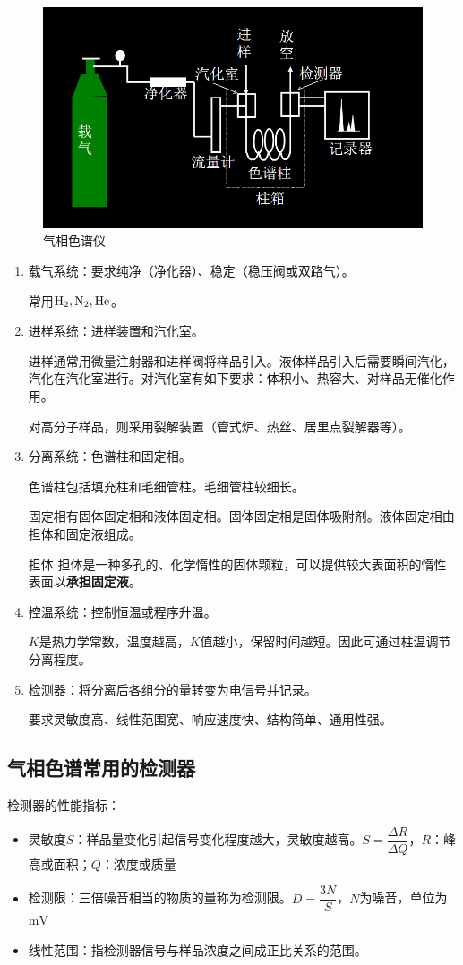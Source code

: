 \begin{figure}[!h]
	\centering
	\includegraphics[width=0.7\linewidth]{image/chp1_GC_apa}
	\caption{气相色谱仪}
	\label{fig:chp1gcapa}
\end{figure}
\begin{enumerate}
	\item 载气系统：要求纯净（净化器）、稳定（稳压阀或双路气）。
	
	常用$\ce{H2,N2,He}$。
	\item 进样系统：进样装置和汽化室。
	
	进样通常用微量注射器和进样阀将样品引入。液体样品引入后需要瞬间汽化，汽化在汽化室进行。对汽化室有如下要求：体积小、热容大、对样品无催化作用。
	
	对高分子样品，则采用裂解装置（管式炉、热丝、居里点裂解器等）。
	\item 分离系统：色谱柱和固定相。
	
	色谱柱包括填充柱和毛细管柱。毛细管柱较细长。
	
	固定相有固体固定相和液体固定相。固体固定相是固体吸附剂。液体固定相由担体和固定液组成。
	
	\begin{definition*}{担体}{}
		担体是一种多孔的、化学惰性的固体颗粒，可以提供较大表面积的惰性表面以\textbf{承担固定液}。
	\end{definition*}
	\item 控温系统：控制恒温或程序升温。
	
	$K$是热力学常数，温度越高，$K$值越小，保留时间越短。因此可通过柱温调节分离程度。
	\item 检测器：将分离后各组分的量转变为电信号并记录。
	
	要求灵敏度高、线性范围宽、响应速度快、结构简单、通用性强。
\end{enumerate}

\subsection{气相色谱常用的检测器}
检测器的性能指标：
\begin{itemize}
	\item 灵敏度$S$：样品量变化引起信号变化程度越大，灵敏度越高。$S=\dfrac{\Delta R}{\Delta  Q}$，$R$：峰高或面积；$Q$：浓度或质量
	\item 检测限：三倍噪音相当的物质的量称为检测限。$D=\dfrac{3N}{S}$，$N$为噪音，单位为$\mathrm{mV}$
	\item 线性范围：指检测器信号与样品浓度之间成正比关系的范围。
\end{itemize}

